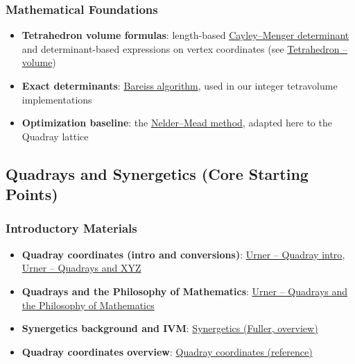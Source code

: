 \documentclass[
  10pt,
]{article}
\providecommand{\tightlist}{%
  \setlength{\itemsep}{0pt}\setlength{\parskip}{0pt}}
\begin{document}
\hypertarget{mathematical-foundations}{%
\subsubsection{Mathematical
Foundations}\label{mathematical-foundations}}

\begin{itemize}
\tightlist
\item
  \textbf{Tetrahedron volume formulas}: length-based
  \href{https://en.wikipedia.org/wiki/Cayley\%E2\%80\%93Menger_determinant}{Cayley--Menger
  determinant} and determinant-based expressions on vertex coordinates
  (see
  \href{https://en.wikipedia.org/wiki/Tetrahedron\#Volume}{Tetrahedron
  -- volume})
\item
  \textbf{Exact determinants}:
  \href{https://en.wikipedia.org/wiki/Bareiss_algorithm}{Bareiss
  algorithm}, used in our integer tetravolume implementations
\item
  \textbf{Optimization baseline}: the
  \href{https://en.wikipedia.org/wiki/Nelder\%E2\%80\%93Mead_method}{Nelder--Mead
  method}, adapted here to the Quadray lattice
\end{itemize}

\hypertarget{quadrays-and-synergetics-core-starting-points}{%
\subsection{Quadrays and Synergetics (Core Starting
Points)}\label{quadrays-and-synergetics-core-starting-points}}

\hypertarget{introductory-materials}{%
\subsubsection{Introductory Materials}\label{introductory-materials}}

\begin{itemize}
\tightlist
\item
  \textbf{Quadray coordinates (intro and conversions)}:
  \href{https://www.grunch.net/synergetics/quadintro.html}{Urner --
  Quadray intro},
  \href{https://www.grunch.net/synergetics/quadxyz.html}{Urner --
  Quadrays and XYZ}
\item
  \textbf{Quadrays and the Philosophy of Mathematics}:
  \href{https://www.grunch.net/synergetics/quadphil.html}{Urner --
  Quadrays and the Philosophy of Mathematics}
\item
  \textbf{Synergetics background and IVM}:
  \href{https://en.wikipedia.org/wiki/Synergetics_(Fuller)}{Synergetics
  (Fuller, overview)}
\item
  \textbf{Quadray coordinates overview}:
  \href{https://en.wikipedia.org/wiki/Quadray_coordinates}{Quadray
  coordinates (reference)}
\end{itemize}
\end{document}
